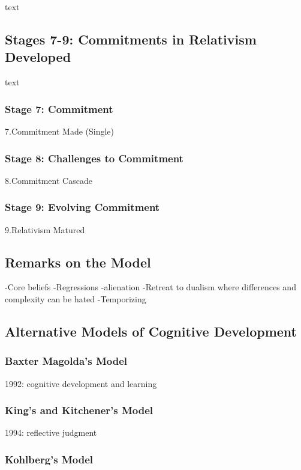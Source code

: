 text

\subsection{Stages 7-9: Commitments in Relativism Developed}

text

\subsubsection{Stage 7: Commitment}

7.Commitment Made (Single)

\subsubsection{Stage 8: Challenges to Commitment}

8.Commitment Cascade

\subsubsection{Stage 9: Evolving Commitment}

9.Relativism Matured

\subsection{Remarks on the Model}

-Core beliefs
-Regressions
	-alienation
	-Retreat to dualism where differences and complexity can be hated
	-Temporizing

\subsection{Alternative Models of Cognitive Development}

\subsubsection{Baxter Magolda's Model}

1992: cognitive development and learning

\subsubsection{King's and Kitchener's Model}

1994: reflective judgment

\subsubsection{Kohlberg's Model}

